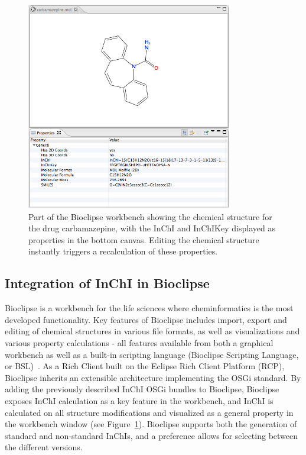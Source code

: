 \documentclass[10pt]{bmc_article}
\newenvironment{bmcformat}{\fussy\setboolean{publ}{true}}{\fussy}
\begin{document}
\begin{bmcformat}
\begin{figure}[!hb]
\begin{center}
	\includegraphics[width=9cm]{carbamazepine-props.png}

\caption{Part of the Bioclipse workbench showing the chemical structure for the drug carbamazepine, with the InChI and InChIKey displayed as properties in the bottom canvas. Editing the chemical structure instantly triggers a recalculation of these properties.}
\label{fig:carba-prop}
\end{center}
\end{figure}


\subsection*{Integration of InChI in Bioclipse}
Bioclipse is a workbench for the life sciences where cheminformatics is the most developed functionality. Key features of Bioclipse includes import, export and editing of chemical structures in various file formats, as well as visualizations and various property calculations - all features available from both a graphical workbench as well as a built-in scripting language (Bioclipse Scripting Language, or BSL)~\cite{Spjuth:2009ly}. As a Rich Client built on the Eclipse Rich Client Platform (RCP), Bioclipse inherits an extensible architecture implementing the OSGi standard. By adding the previously described InChI OSGi bundles to Bioclipse, Bioclipse exposes InChI calculation as a key feature in the workbench, and InChI is calculated on all structure modifications and visualized as a general property in the workbench window (see Figure~\ref{fig:carba-prop}). Bioclipse supports both the generation of standard and non-standard InChIs, and a preference allows for selecting between the different versions.




\end{bmcformat}
\end{document}
